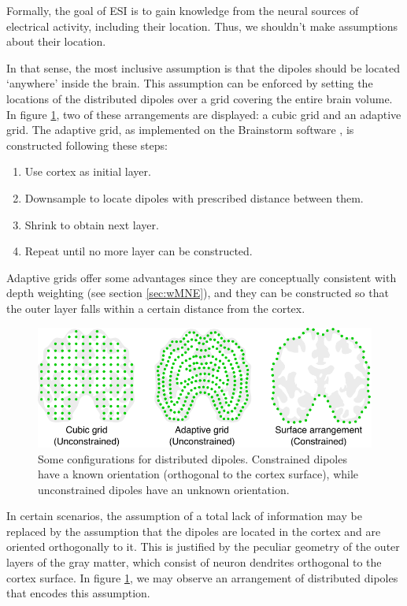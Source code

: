 Formally, the goal of ESI is to gain knowledge from the neural sources of electrical activity, including their location. 
%
Thus, we shouldn't make assumptions about their location.

In that sense, the most inclusive assumption is that the dipoles should be located `anywhere' inside the brain.
%
This assumption can be enforced by setting the locations of the distributed dipoles over a grid covering the entire brain volume.
%
In figure \ref{fig:dipoles}, two of these arrangements are displayed: a cubic grid and an adaptive grid. 
%
The adaptive grid, as implemented on the Brainstorm software \cite{brainstorm}, is constructed following these steps:
\begin{enumerate}
    \item Use cortex as initial layer.
    \item Downsample to locate dipoles with prescribed distance between them.
    \item Shrink to obtain next layer.
    \item Repeat until no more layer can be constructed.
\end{enumerate}

Adaptive grids offer some advantages since they are conceptually consistent with depth weighting (see section \ref{sec:wMNE}), and they can be constructed so that the outer layer falls within a certain distance from the cortex.

\begin{figure}
\centering
\includegraphics{./img/DipoleGrid.pdf}
\caption{Some configurations for distributed dipoles. Constrained dipoles have a known orientation (orthogonal to the cortex surface), while unconstrained dipoles have an unknown orientation.}
\label{fig:dipoles}
\end{figure}

In certain scenarios, the assumption of a total lack of information may be replaced by the assumption that the dipoles are located in the cortex and are oriented orthogonally to it.
%
This is justified by the peculiar geometry of the outer layers of the gray matter, which consist of neuron dendrites orthogonal to the cortex surface.
%
In figure \ref{fig:dipoles}, we may observe an arrangement of distributed dipoles that encodes this assumption.

